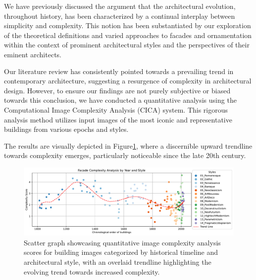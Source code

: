 %    

We have previously discussed the argument that the architectural evolution, throughout history, has been characterized by a continual interplay between simplicity and complexity.
This notion has been substantiated by our exploration of the theoretical definitions and varied approaches to facades and ornamentation within the context of prominent architectural styles and the perspectives of their eminent architects.

Our literature review has consistently pointed towards a prevailing trend in contemporary architecture, suggesting a resurgence of complexity in architectural design.
However, to ensure our findings are not purely subjective or biased towards this conclusion, we have conducted a quantitative analysis using the Computational Image Complexity Analysis (CICA) system.
This rigorous analysis method utilizes input images of the most iconic and representative buildings from various epochs and styles.

The results are visually depicted in Figure\ref{fig:HistoricalComplexityGraph}, where a discernible upward trendline towards complexity emerges, particularly noticeable since the late 20th century.

     \begin{figure}[!htb]
          \centering
          \includegraphics[width= \linewidth]{Graphs/complexitygraph}
          \caption{Scatter graph showcasing quantitative image complexity analysis scores for building images categorized by historical timeline and architectural style, with an overlaid trendline highlighting the evolving trend towards increased complexity.}
          \label{fig:HistoricalComplexityGraph}
     \end{figure}








